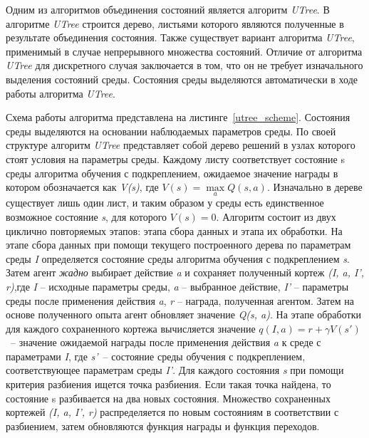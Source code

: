 Одним из алгоритмов объединения состояний является алгоритм \textit{UTree}. В алгоритме \textit{UTree} строится дерево, листьями которого являются полученные в результате объединения состояния. Также существует вариант алгоритма \textit{UTree}, применимый в случае непрерывного множества состояний. Отличие от алгоритма \textit{UTree} для дискретного случая заключается в том, что он не требует изначального выделения состояний среды. Состояния среды выделяются автоматически в ходе работы алгоритма \textit{UTree}.

Схема работы алгоритма представлена на листинге~\ref{utree_scheme}. Состояния среды выделяются на основании наблюдаемых параметров среды. По своей структуре алгоритм \textit{UTree} представляет собой дерево решений в узлах которого стоят условия на параметры среды. Каждому листу соответствует состояние s среды алгоритма обучения с подкреплением, ожидаемое значение награды в котором обозначается как \textit{V(s)}, где $V(s) = \max \limits_a Q(s,a)$. Изначально в дереве существует лишь один лист, и таким образом у среды есть единственное возможное состояние \textit{s}, для которого $V(s) = 0$. Алгоритм состоит из двух циклично повторяемых этапов: этапа сбора данных и этапа их обработки. На этапе сбора данных при помощи текущего построенного дерева по параметрам среды \textit{I} определяется состояние среды алгоритма обучения с подкреплением \textit{s}. Затем агент \textit{жадно} выбирает действие \textit{a} и сохраняет полученный кортеж \textit{(I, a, I', r)},где \textit{I} -- исходные параметры среды, \textit{a} -- выбранное действие, \textit{I'} -- параметры среды после применения действия \textit{a}, \textit{r} -- награда, полученная агентом. Затем на основе полученного опыта агент обновляет значение \textit{Q(s, a)}. На этапе обработки для каждого сохраненного кортежа вычисляется значение $q(I, a) =  r + \gamma V (s')$~-- значение ожидаемой награды после применения действия \textit{a} к среде с параметрами \textit{I}, где \textit{s'}~-- состояние среды обучения с подкреплением, соответствующее параметрам среды \textit{I'}. Для каждого состояния \textit{s} при помощи критерия разбиения ищется точка разбиения. Если такая точка найдена, то состояние s разбивается на два новых состояния. Множество сохраненных кортежей \textit{(I, a, I', r)} распределяется по новым состояниям в соответствии с разбиением, затем обновляются функция награды и функция переходов.


